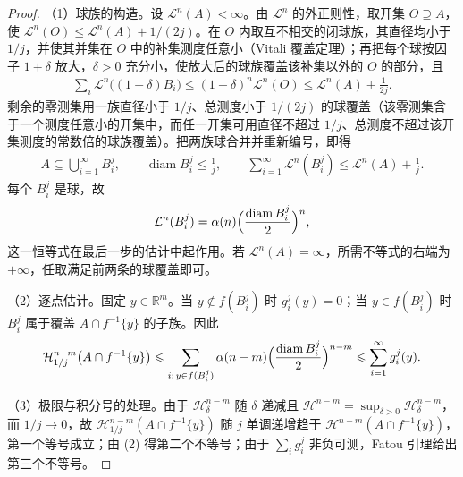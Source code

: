 \documentclass[../../main.tex]{subfiles}%
\begin{document}
\begin{proof}
（1）球族的构造。设 $\mathcal{L}^n(A)<\infty$。由 $\mathcal{L}^n$ 的外正则性，取开集 $O\supseteq A$，使 $\mathcal{L}^n(O)\leqslant\mathcal{L}^n(A)+1/(2j)$。在 $O$ 内取互不相交的闭球族，其直径均小于 $1/j$，并使其并集在 $O$ 中的补集测度任意小（Vitali 覆盖定理）；再把每个球按因子 $1+\delta$ 放大，$\delta>0$ 充分小，使放大后的球族覆盖该补集以外的 $O$ 的部分，且
\begin{align*}
\sum_i\mathcal{L}^n\bigl((1+\delta)B_i\bigr)\leqslant(1+\delta)^n\mathcal{L}^n(O)\leqslant\mathcal{L}^n(A)+\frac{1}{2j}.
\end{align*}
剩余的零测集用一族直径小于 $1/j$、总测度小于 $1/(2j)$ 的球覆盖（该零测集含于一个测度任意小的开集中，而任一开集可用直径不超过 $1/j$、总测度不超过该开集测度的常数倍的球族覆盖）。把两族球合并并重新编号，即得
\begin{align*}
A\subseteq\bigcup_{i=1}^{\infty}B_i^j,\qquad\operatorname{diam}B_i^j\leqslant\frac{1}{j},\qquad\sum_{i=1}^{\infty}\mathcal{L}^n(B_i^j)\leqslant\mathcal{L}^n(A)+\frac{1}{j}.
\end{align*}
每个 $B_i^j$ 是球，故
\begin{align*}
\mathcal{L}^n(B_i^j)=\alpha(n)\Bigl(\frac{\operatorname{diam}B_i^j}{2}\Bigr)^n,
\end{align*}
这一恒等式在最后一步的估计中起作用。若 $\mathcal{L}^n(A)=\infty$，所需不等式的右端为 $+\infty$，任取满足前两条的球覆盖即可。

（2）逐点估计。固定 $y\in\mathbb{R}^m$。当 $y\notin f(B_i^j)$ 时 $g_i^j(y)=0$；当 $y\in f(B_i^j)$ 时 $B_i^j$ 属于覆盖 $A\cap f^{-1}\{y\}$ 的子族。因此
\begin{align*}
\mathcal{H}^{n-m}_{1/j}\bigl(A\cap f^{-1}\{y\}\bigr)\leqslant\sum_{i:\,y\in f(B_i^j)}\alpha(n-m)\Bigl(\frac{\operatorname{diam}B_i^j}{2}\Bigr)^{n-m}\leqslant\sum_{i=1}^{\infty}g_i^j(y).
\end{align*}

（3）极限与积分号的处理。由于 $\mathcal{H}^{n-m}_{\delta}$ 随 $\delta$ 递减且 $\mathcal{H}^{n-m}=\sup_{\delta>0}\mathcal{H}^{n-m}_{\delta}$，而 $1/j\to0$，故 $\mathcal{H}^{n-m}_{1/j}(A\cap f^{-1}\{y\})$ 随 $j$ 单调递增趋于 $\mathcal{H}^{n-m}(A\cap f^{-1}\{y\})$，第一个等号成立；由 (2) 得第二个不等号；由于 $\sum_{i}g_i^j$ 非负可测，Fatou 引理给出第三个不等号。


\end{proof}
\end{document}
